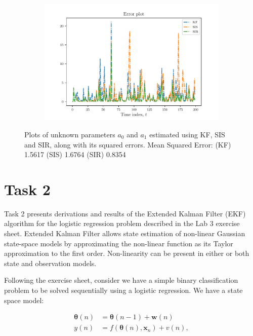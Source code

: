 \documentclass{article}
\begin{document}
\begin{figure}
    \centering
    \begin{subfigure}{.6\textwidth}
        \includegraphics[width=\textwidth]{Figures/error.pdf}
    \end{subfigure}
    \caption{Plots of unknown parameters $a_0$ and $a_1$ estimated using KF, SIS and SIR, along with its squared errors. Mean Squared Error: (KF) 1.5617 (SIS) 1.6764 (SIR) 0.8354}
    \label{fig:results-1}
\end{figure}


\section{Task 2}

Task 2 presents derivations and results of the Extended Kalman Filter (EKF) algorithm for the logistic regression problem described in the Lab 3 exercise sheet. Extended Kalman Filter allows state estimation of non-linear Gaussian state-space models by approximating the non-linear function as its Taylor approximation to the first order. Non-linearity can be present in either or both state and observation models.

Following the exercise sheet, consider we have a simple binary classification problem to be solved sequentially using a logistic regression. We have a state space model:

\begin{equation}
    \begin{split}
        \pmb{\theta} (n) &= \pmb{\theta} (n-1) + \pmb{w}(n)\\
        y(n) &= f(\pmb{\theta}(n), \pmb{x}_n) + v(n),
    \end{split}
\end{equation}
\end{document}
